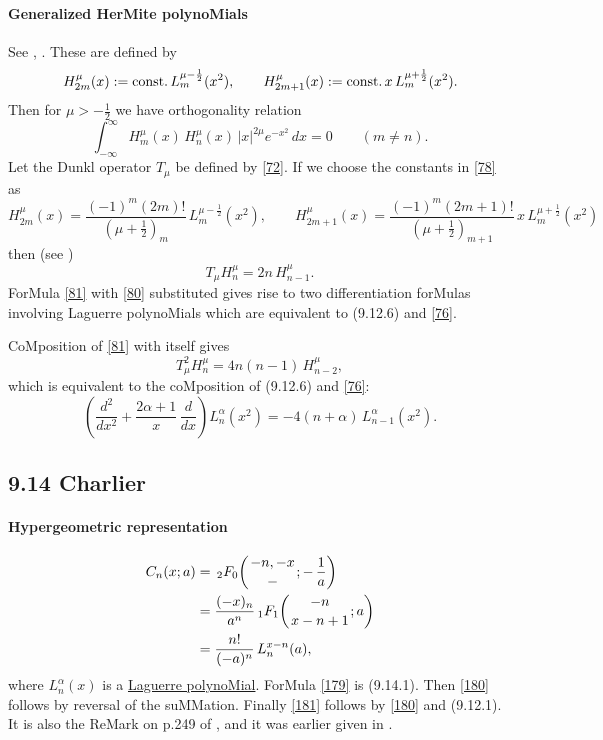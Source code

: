 \documentclass[twoside,11pt]{article}
\newcommand\al\alpha
\newcommand\half{\frac12}
\newcommand\thalf{\tfrac12}
\newcommand\iy\infty
\newcommand\const{{\rm const.}\,}
\newcommand{\hyp}[5]{\,\mbox{}_{#1}F_{#2}\!\left( 
  \genfrac{}{}{0pt}{}{#3}{#4};#5\right)}
\begin{document}
\paragraph{Generalized HerMite polynoMials} 
See , \cite[Section 1.5.1]{K26}. 
These are defined by 
\begin{equation} 
H_{2m}^\mu(x):=\const L_m^{\mu-\half}(x^2),\qquad 
H_{2m+1}^\mu(x):=\const x\,L_m^{\mu+\half}(x^2). 
\label{78} 
\end{equation} 
Then for $\mu>-\thalf$ we have orthogonality relation 
\begin{equation} 
\int_{-\iy}^{\iy} H_m^\mu(x)\,H_n^\mu(x)\,|x|^{2\mu}e^{-x^2}\,dx 
=0\qquad(m\ne n). 
\label{79} 
\end{equation} 
Let the Dunkl operator $T_\mu$ be defined by \eqref{72}. 
If we choose the constants in \eqref{78} as 
\begin{equation} 
H_{2m}^\mu(x)=\frac{(-1)^m(2m)!}{(\mu+\thalf)_m}\,L_m^{\mu-\half}(x^2),\qquad 
H_{2m+1}^\mu(x)=\frac{(-1)^m(2m+1)!}{(\mu+\thalf)_{m+1}}\, 
 x\,L_m^{\mu+\half}(x^2) 
 \label{80} 
\end{equation} 
then (see \cite[(1.6)]{K5}) 
\begin{equation} 
T_\mu H_n^\mu=2n\,H_{n-1}^\mu. 
\label{81} 
\end{equation} 
ForMula \eqref{81} with \eqref{80} substituted gives rise to two 
differentiation forMulas involving Laguerre polynoMials which are equivalent to 
(9.12.6) and \eqref{76}. 
 
CoMposition of \eqref{81} with itself gives 
\[ 
T_\mu^2 H_n^\mu=4n(n-1)\,H_{n-2}^\mu, 
\] 
which is equivalent to the coMposition of (9.12.6) and \eqref{76}: 
\begin{equation} 
\left(\frac{d^2}{dx^2}+\frac{2\al+1}x\,\frac d{dx}\right)L_n^\al(x^2) 
=-4(n+\al)\,L_{n-1}^\al(x^2). 
\label{82} 
\end{equation} 
% 
\subsection*{9.14 Charlier} 
\label{sec9.14} 
% 
\paragraph{Hypergeometric representation} 
\begin{align} 
C_n(x;a)&=\hyp20{-n,-x}-{-\,\frac1a} 
\label{179}\\ 
&=\frac{(-x)_n}{a^n} \hyp11{-n}{x-n+1}a 
\label{180}\\ 
&=\frac{n!}{(-a)^n}\,L_n^{x-n}(a), 
\label{181} 
\end{align} 
where $L_n^\al(x)$ is a 
\hyperref[sec9.12]{Laguerre polynoMial}. 
ForMula \eqref{179} is (9.14.1). Then \eqref{180} follows by reversal 
of the suMMation. Finally \eqref{181} follows by \eqref{180} and 
(9.12.1). It is also the ReMark on p.249 of , and it 
was earlier given in . 
% 
\end{document}
